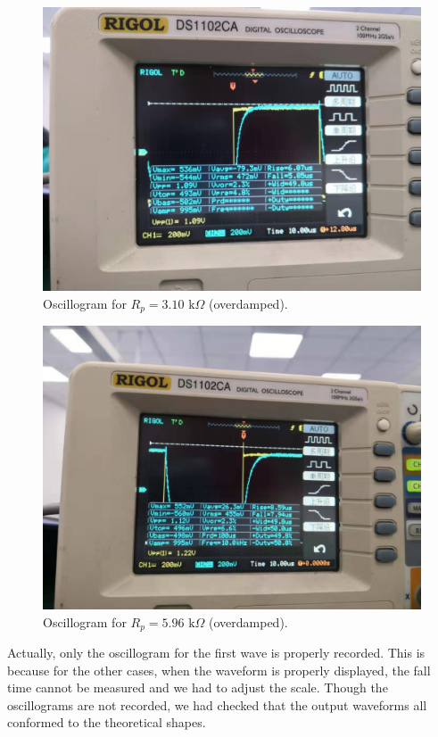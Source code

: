\documentclass{article}
\begin{document}
\begin{figure}[H]
\centering
\includegraphics[scale=0.22]{5.jpg}
\caption{Oscillogram for $R_p=3.10\,\,\text{k}\Omega$ (overdamped).}\label{FigO1}
\end{figure}

\begin{figure}[H]
\centering
\includegraphics[scale=0.22]{6.jpg}
\caption{Oscillogram for $R_p=5.96\,\,\text{k}\Omega$ (overdamped).}\label{FigO2}
\end{figure}

Actually, only the oscillogram for the first wave is properly recorded. This is because for the other cases, when the waveform is properly displayed, the fall time cannot be measured and we had to adjust the scale. Though the oscillograms are not recorded, we had checked that the output waveforms all conformed to the theoretical shapes.
\end{document}
